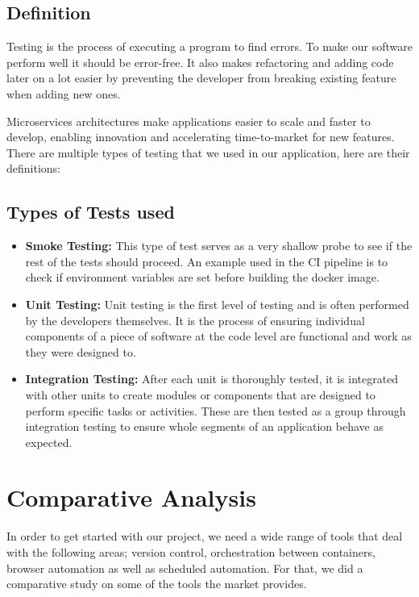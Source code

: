 \subsection{Definition}
Testing is the process of executing a program to find errors.
To make our software perform well it should be error-free.
It also makes refactoring and adding code later on a lot easier by preventing the developer from breaking existing feature when adding new ones.

Microservices architectures make applications easier to scale and faster to develop, enabling innovation and accelerating time-to-market for new features.
There are multiple types of testing that we used in our application, here are their definitions:

\subsection{Types of Tests used}
\begin{itemize}
    \item \textbf{Smoke Testing:} This type of test serves as a very shallow probe to see if the rest of the tests should proceed. An example used in the CI pipeline is to check if environment variables are set before building the docker image.
    \item \textbf{Unit Testing:} Unit testing is the first level of testing and is often performed by the developers themselves. It is the process of ensuring individual components of a piece of software at the code level are functional and work as they were designed to.
    \item \textbf{Integration Testing:} After each unit is thoroughly tested, it is integrated with other units to create modules or components that are designed to perform specific tasks or activities. These are then tested as a group through integration testing to ensure whole segments of an application behave as expected.
\end{itemize}

\newpage
\section{Comparative Analysis}
In order to get started with our project, we need a wide range of tools that deal with the following areas; version control, orchestration between containers, browser automation as well as scheduled automation. For that, we did a comparative study on some of the tools the market provides.

